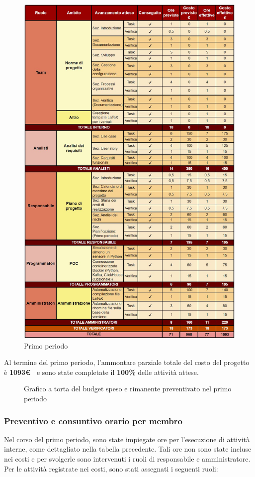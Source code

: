 \documentclass{article}
\begin{document}
\begin{figure}[H]
    \centering
    \includegraphics[height=1.1\textwidth]{../Images/periodo1.jpg}
    \caption{Primo periodo}
    \label{fig:1periodo}
\end{figure}

Al termine del primo periodo, l'ammontare parziale totale del costo del progetto è \textbf{ 1093\euro\ } e sono state completate il \textbf{100\%} delle attività attese.

\begin{figure}[h]
    \centering
    \caption{Grafico a torta del budget speso e rimanente preventivato nel primo periodo}
\end{figure}

\subsubsection*{Preventivo e consuntivo orario per membro}
Nel corso del primo periodo, sono state impiegate ore per l'esecuzione di attività interne, come dettagliato nella tabella precedente. Tali ore non sono state incluse nei costi e per svolgerle sono intervenuti i ruoli di responsabile e amministratore.
Per le attività registrate nei costi, sono stati assegnati i seguenti ruoli:
\end{document}
